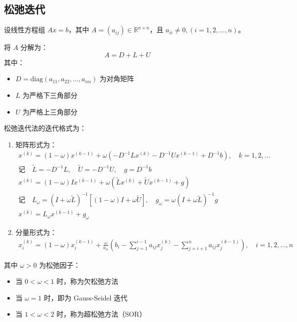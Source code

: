 \subsection{松弛迭代}

设线性方程组 $Ax = b$，其中 $A = (a_{ij}) \in \mathbb{R}^{n \times n}$，且 $a_{ii} \neq 0, (i = 1, 2, \dots, n)$。

将 $A$ 分解为：
\[
A = D + L + U
\]
其中：
\begin{itemize}
    \item $D = \text{diag}(a_{11}, a_{22}, \dots, a_{nn})$ 为对角矩阵
    \item $L$ 为严格下三角部分
    \item $U$ 为严格上三角部分
\end{itemize}

松弛迭代法的迭代格式为：
\begin{enumerate}
    \item 矩阵形式为：
\begin{gather*}
x^{(k)} = (1-\omega)x^{(k-1)}+\omega(-D^{-1}Lx^{(k)} -D^{-1}Ux^{(k-1)} + D ^{-1}b), \quad k = 1, 2, \dots\\
\text{记}\quad \tilde{L}=-D^{-1}L,\quad \tilde{U}=-D^{-1}U,\quad g=D^{-1}b\\
x^{(k)} = (1-\omega)I x^{(k-1)} + \omega( \tilde{L} x^{(k)} +  \tilde{U} x^{(k-1)} +  g)\\
\text{记}\quad L_\omega = (I+\omega \tilde{L})^{-1}[(1-\omega)I + \omega \tilde{U}],\quad g_\omega = \omega (I+\omega \tilde{L})^{-1}g\\
x^{(k)} = L_\omega x^{(k-1)} + g_\omega
\end{gather*}

\item 分量形式为：
\begin{gather*}
x_i^{(k)} = (1 - \omega)x_i^{(k-1)} + \frac{\omega}{a_{ii}} \left( b_i - \sum_{j=1}^{i-1} a_{ij}x_j^{(k)} - \sum_{j=i+1}^{n} a_{ij}x_j^{(k-1)} \right), \quad i = 1, 2, \dots, n
\end{gather*}
\end{enumerate}

其中 $\omega > 0$ 为松弛因子：
\begin{itemize}
    \item 当 $0 < \omega < 1$ 时，称为欠松弛方法
    \item 当 $\omega = 1$ 时，即为 Gauss-Seidel 迭代
    \item 当 $1 < \omega < 2$ 时，称为超松弛方法（SOR）
\end{itemize}

